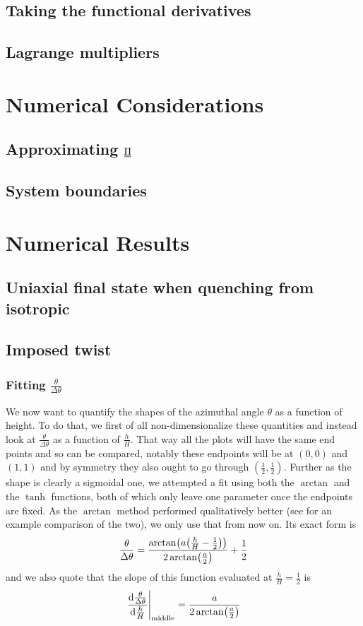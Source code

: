 \documentclass[12pt]{article}
\newcommand{\duf}[2]{\stackunder[0.5pt]{\stackunder[0.8pt]{\stackunder[1pt]{\ensuremath{#1}}{\rule{\widthof{\ensuremath{#2}}*\real{0.9}}{.1ex}}}{\rule{\widthof{\ensuremath{#2}}*\real{0.9}}{.1ex}}}{}}
\newcommand{\du}[1]{\duf{#1}{#1}}
\newcommand{\PP}{\ensuremath{\du{\Pi}}}
\begin{document}
    \subsection{Taking the functional derivatives}
    \subsection{Lagrange multipliers}

\section{Numerical Considerations}
    \subsection{Approximating \PP{}}
    \subsection{System boundaries }

\section{Numerical Results}
    \subsection{Uniaxial final state when quenching from isotropic}
    \subsection{Imposed twist}
    \subsubsection{Fitting $\frac{\theta}{\Delta\theta}$}
    We now want to quantify the shapes of the azimuthal angle $\theta$ as a function of height.
    To do that, we first of all non-dimensionalize these quantities and instead look at $\frac{\theta}{\Delta\theta}$ as a function of $\frac{h}{H}$.
    That way all the plots will have the same end points and so can be compared, notably these endpoints will be at $(0, 0)$ and $(1, 1)$ and by symmetry they also ought to go through $(\frac{1}{2}, \frac{1}{2})$.
    Further as the shape is clearly a sigmoidal one, we attempted a fit using both the $\arctan$ and the $\tanh$ functions, both of which only leave one parameter once the endpoints are fixed.
    As the $\arctan$ method performed qualitatively better (see  for an example comparison of the two), we only use that from now on.
    Its exact form is
    \begin{equation}
        \frac{\theta}{\Delta\theta} = \frac{\arctan(a \qty(\frac{h}{H} - \frac{1}{2}))}{2\arctan(\frac{a}{2})} + \frac{1}{2}
    \end{equation}
    and we also quote that the slope of this function evaluated at $\frac{h}{H} = \frac{1}{2}$ is
    \begin{equation}
        \eval{\dv{\frac{\theta}{\Delta\theta}}{\frac{h}{H}}}_\text{middle} = \frac{a}{2\arctan(\frac{a}{2})}
    \end{equation}
\end{document}
